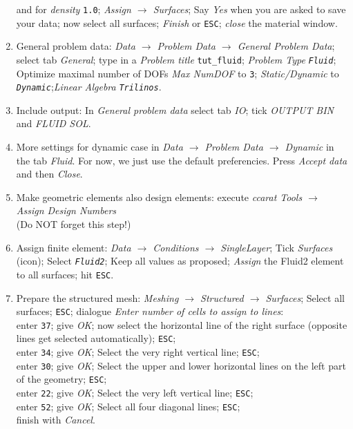\begin{enumerate}
and for \emph{density} \texttt{1.0}; \emph{Assign $\rightarrow$
Surfaces}; Say \emph{Yes} when you are asked to save your data; now select all surfaces; \emph{Finish} or \texttt{ESC}; \emph{close} the material window. 
\item General problem data: \emph{Data $\rightarrow$ Problem Data $\rightarrow$
General Problem Data}; select tab \emph{General}; type in a \emph{Problem
title} \texttt{tut\_fluid}; \emph{Problem Type} \texttt{\emph{Fluid}};
Optimize maximal number of DOFs \emph{Max NumDOF} to \texttt{3}; \emph{Static/Dynamic}
to \texttt{\emph{Dynamic}};\emph{Linear Algebra} \texttt{\emph{Trilinos}}.
\item Include output: In \emph{General problem data} select tab \emph{IO}; tick \emph{OUTPUT BIN} and \emph{FLUID SOL}. 
\item More settings for dynamic case in \emph{Data $\rightarrow$ Problem
Data $\rightarrow$ Dynamic} in the tab \emph{Fluid}. For now, we just use the default preferencies.
Press \emph{Accept data} and then \emph{Close}.
\item Make geometric elements also design elements: execute \emph{ccarat Tools $\rightarrow$ Assign Design Numbers}\\
(Do NOT forget this step!)
\item Assign finite element: \emph{Data $\rightarrow$ Conditions $\rightarrow$
SingleLayer}; Tick \emph{Surfaces} (icon); Select \texttt{\emph{Fluid2}};
Keep all values as proposed; \emph{Assign} the Fluid2 element to all surfaces; hit \texttt{ESC}.
\item Prepare the structured mesh: \emph{Meshing $\rightarrow$ Structured
$\rightarrow$ Surfaces}; Select all surfaces; \texttt{ESC}; dialogue
\emph{Enter number of cells to assign to lines}:\\
enter \texttt{37}; give \emph{OK}; now select the horizontal line of the right surface (opposite
lines get selected automatically); \texttt{ESC};\\
enter \texttt{34}; give \emph{OK}; Select the very right vertical line; \texttt{ESC};\\ 
enter \texttt{30}; give \emph{OK}; Select the upper and lower horizontal lines on the left part of the geometry; \texttt{ESC};\\
enter \texttt{22}; give \emph{OK}; Select the very left vertical line; \texttt{ESC};\\
enter \texttt{52}; give \emph{OK}; Select all four diagonal lines; \texttt{ESC};\\
finish with \emph{Cancel}.

\end{enumerate}
